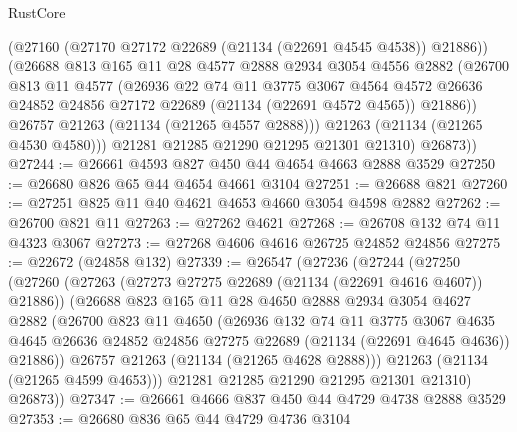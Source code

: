 \begin{lexlean}{RustCore}
\begin{coremodule}
            (@27160 (@27170 @27172 @22689 (@21134 (@22691 @4545 @4538)) @21886))
            (@26688
              @813
              @165
              @11
              @28
              @4577
              @2888
              @2934
              @3054
              @4556
              @2882
              (@26700
                @813
                @11
                @4577
                (@26936
                  @22
                  @74
                  @11
                  @3775
                  @3067
                  @4564
                  @4572
                  @26636
                  @24852
                  @24856
                  @27172
                  @22689
                  (@21134 (@22691 @4572 @4565))
                  @21886))
              @26757
              @21263
              (@21134 (@21265 @4557 @2888)))
            @21263
            (@21134 (@21265 @4530 @4580)))
          @21281
          @21285
          @21290
          @21295
          @21301
          @21310)
        @26873))
@27244 := @26661 @4593 @827 @450 @44 @4654 @4663 @2888 @3529
@27250 := @26680 @826 @65 @44 @4654 @4661 @3104
@27251 := @26688 @821
@27260 := @27251 @825 @11 @40 @4621 @4653 @4660 @3054 @4598 @2882
@27262 := @26700 @821 @11
@27263 := @27262 @4621
@27268 := @26708 @132 @74 @11 @4323 @3067
@27273 := @27268 @4606 @4616 @26725 @24852 @24856
@27275 := @22672 (@24858 @132)
@27339 := @26547
    (@27236
      (@27244
        (@27250
          (@27260
            (@27263 (@27273 @27275 @22689 (@21134 (@22691 @4616 @4607)) @21886))
            (@26688
              @823
              @165
              @11
              @28
              @4650
              @2888
              @2934
              @3054
              @4627
              @2882
              (@26700
                @823
                @11
                @4650
                (@26936
                  @132
                  @74
                  @11
                  @3775
                  @3067
                  @4635
                  @4645
                  @26636
                  @24852
                  @24856
                  @27275
                  @22689
                  (@21134 (@22691 @4645 @4636))
                  @21886))
              @26757
              @21263
              (@21134 (@21265 @4628 @2888)))
            @21263
            (@21134 (@21265 @4599 @4653)))
          @21281
          @21285
          @21290
          @21295
          @21301
          @21310)
        @26873))
@27347 := @26661 @4666 @837 @450 @44 @4729 @4738 @2888 @3529
@27353 := @26680 @836 @65 @44 @4729 @4736 @3104

\end{coremodule}
\end{lexlean}
